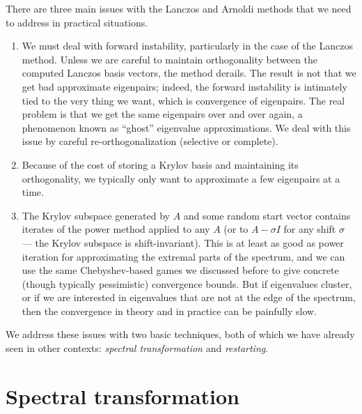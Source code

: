 \documentclass[12pt, leqno]{article} %
\begin{document}
There are three main issues with the Lanczos and Arnoldi methods
that we need to address in practical situations.
\begin{enumerate}
\item
  We must deal with forward instability, particularly in the case of the
  Lanczos method.  Unless we are careful to maintain orthogonality
  between the computed Lanczos basis vectors, the method derails.  The
  result is not that we get bad approximate eigenpairs; indeed, the
  forward instability is intimately tied to the very thing we want,
  which is convergence of eigenpairs.  The real problem is that we get
  the same eigenpairs over and over again, a phenomenon known as
  ``ghost'' eigenvalue approximations.  We deal with this issue by
  careful re-orthogonalization (selective or complete).
\item
  Because of the cost of storing a Krylov basis and maintaining its
  orthogonality, we typically only want to approximate a few eigenpairs
  at a time.
\item
  The Krylov subspace generated by $A$ and some random start
  vector contains iterates of the power method applied to any $A$
  (or to $A-\sigma I$ for any shift $\sigma$ --- the Krylov subspace
  is shift-invariant).  This is at least as good as power iteration
  for approximating the extremal parts of the spectrum, and we can
  use the same Chebyshev-based games we discussed before to
  give concrete (though typically pessimistic) convergence bounds.  But if
  eigenvalues cluster, or if we are interested in eigenvalues that
  are not at the edge of the spectrum, then the convergence in theory
  and in practice can be painfully slow.
\end{enumerate}
We address these issues with two basic techniques, both of which
we have already seen in other contexts: {\em spectral transformation}
and {\em restarting}.

\section{Spectral transformation}
\end{document}
